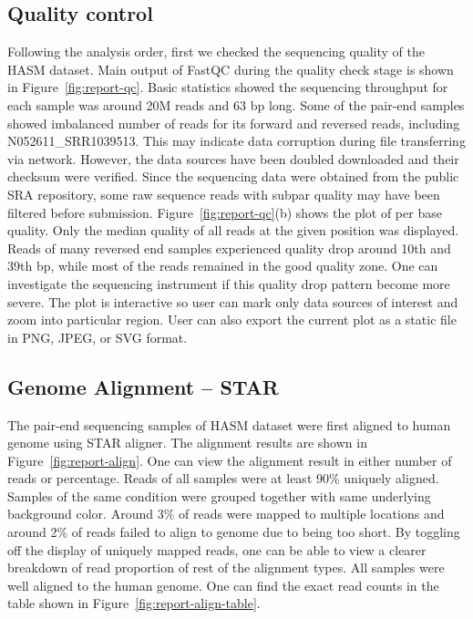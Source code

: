 \subsection{Quality control}



Following the analysis order, first we checked the sequencing quality of the
HASM dataset. Main output of FastQC during the quality check stage is shown in
Figure~\ref{fig:report-qc}. Basic statistics showed the sequencing throughput
for each sample was around 20M reads and 63 bp long. Some of the pair-end
samples showed imbalanced number of reads for its forward and reversed reads,
including N052611\_SRR1039513. This may indicate data corruption during file
transferring via network. However, the data sources have been doubled
downloaded and their checksum were verified. Since the sequencing data were
obtained from the public SRA repository, some raw sequence reads with subpar
quality may have been filtered before submission. Figure~\ref{fig:report-qc}(b)
shows the plot of per base quality.  Only the median quality of all reads at
the given position was displayed. Reads of many reversed end samples
experienced quality drop around 10th and 39th bp, while most of the reads
remained in the good quality zone. One can investigate the sequencing
instrument if this quality drop pattern become more severe. The plot is
interactive so user can mark only data sources of interest and zoom into
particular region.  User can also export the current plot as a static file in
PNG, JPEG, or SVG format.


\subsection{Genome Alignment -- STAR}



The pair-end sequencing samples of HASM dataset were first aligned to human
genome using STAR aligner. The alignment results are shown in
Figure~\ref{fig:report-align}. One can view the alignment result in either
number of reads or percentage. Reads of all samples were at least 90\% uniquely
aligned. Samples of the same condition were grouped together with same
underlying background color. Around 3\% of reads were mapped to multiple
locations and around 2\% of reads failed to align to genome due to being too
short. By toggling off the display of uniquely mapped reads, one can be able to
view a clearer breakdown of read proportion of rest of the alignment types.
All samples were well aligned to the human genome. One can find the exact read
counts in the table shown in Figure~\ref{fig:report-align-table}.


